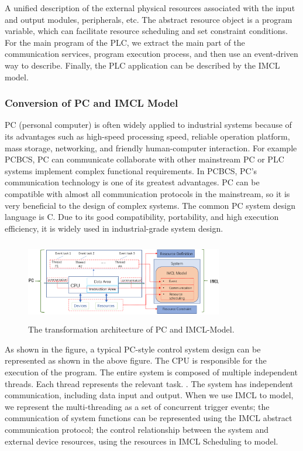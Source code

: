 A unified description of the external physical resources associated with the input and output modules, peripherals, etc. The abstract resource object is a program variable, which can facilitate resource scheduling and set constraint conditions. For the main program of the PLC, we extract the main part of the communication services, program execution process, and then use an event-driven way to describe. Finally, the PLC application can be described by the IMCL model.

\subsubsection{Conversion of PC and IMCL Model}
PC (personal computer) is often widely applied to industrial systems because of its advantages such as high-speed processing speed, reliable operation platform, mass storage, networking, and friendly human-computer interaction. For example PCBCS, PC can communicate collaborate with other mainstream PC or PLC systems implement complex functional requirements. In PCBCS, PC's communication technology is one of its greatest advantages. PC can be compatible with almost all communication protocols in the mainstream, so it is very beneficial to the design of complex systems. The common PC system design language is C. Due to its good compatibility, portability, and high execution efficiency, it is widely used in industrial-grade system design.

\begin{figure}[!htb]
  \centering
        \includegraphics[height=1.4in, width=3.4in]{PC2IMCL}
  \caption{The transformation architecture of PC and IMCL-Model.}\label{PC2IMCL}
\end{figure}

As shown in the figure, a typical PC-style control system design can be represented as shown in the above figure. The CPU is responsible for the execution of the program. The entire system is composed of multiple independent threads. Each thread represents the relevant task. . The system has independent communication, including data input and output. When we use IMCL to model, we represent the multi-threading as a set of concurrent trigger events; the communication of system functions can be represented using the IMCL abstract communication protocol; the control relationship between the system and external device resources, using the resources in IMCL Scheduling to model.


